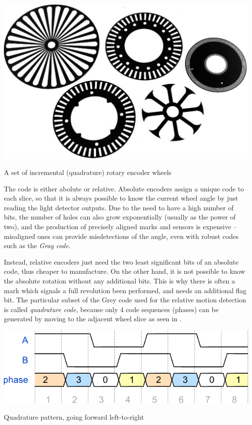 \documentclass[a4paper,10pt]{article}
\makeatletter
\newenvironment{figurehere}{\def\@captype{figure}\vspace{2ex}}{\vspace{2ex}}
\makeatother
\begin{document}
\begin{multicols}{2}
\begin{figurehere}
	\centering
	\includegraphics[keepaspectratio=true,width=0.9\columnwidth]{images/encoder_wheels.pdf}
	\caption{A set of incremental (quadrature) rotary encoder wheels}
	\label{fig:encoder_wheels}
\end{figurehere}

The code is either abolute or relative. Absolute encoders assign a unique code
to each slice, so that it is always possible to know the current wheel angle
by just reading the light detector outputs. Due to the need to have a high
number of bits, the number of holes can also grow exponentially (usually as
the power of two), and the production of precisely aligned marks and sensors
is expensive -- misaligned ones can provide misdetections of the angle, even
with robust codes such as the \emph{Gray code}.

Instead, relative encoders just need the two least significant bits of an
absolute code, thus cheaper to manufacture. On the other hand, it is not
possible to know the absolute rotation without any additional bits. This is
why there is often a mark which signals a full revolution been performed, and
needs an additional flag bit. The particular subset of the Grey code used for
the relative motion detection is called \emph{quadrature code}, because only 4
code sequences (phases) can be generated by moving to the adjacent wheel slice
as seen in .

\begin{figurehere}
	\centering
	\includegraphics[keepaspectratio=true,width=0.9\columnwidth]{images/quad_wave.pdf}
	\caption{Quadrature pattern, going forward left-to-right}
	\label{fig:quad_wave}
\end{figurehere}


\end{multicols}
\end{document}
